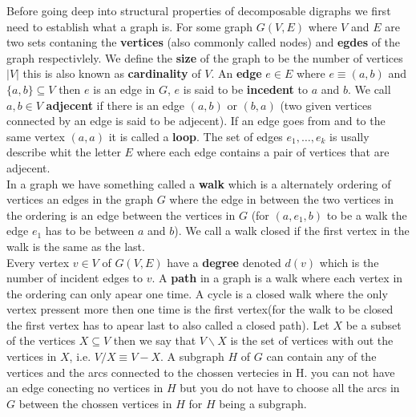 Before going deep into structural properties of decomposable digraphs we first need to establish what a graph is.
For some graph $G(V,E)$ where $V$ and $E$ are two sets contaning the \textbf{vertices} (also commonly called nodes) and \textbf{egdes} of the graph respectivlely.
We define the \textbf{size} of the graph to be the number of vertices $|V|$ this is also known as \textbf{cardinality} of $V$.
An \textbf{edge} $e \in E$ where $e \equiv (a, b)$ and $\{ a, b \} \subseteq V$ then $e$ is an edge in $G$, $e$ is said to be \textbf{incedent} to $a$ and $b$. 
We call $a,b \in V$ \textbf{adjecent} if there is an edge $(a,b)$ or $(b,a)$ (two given vertices connected by an edge is said to be adjecent).
If an edge goes from and to the same vertex $(a,a)$ it is called a \textbf{loop}.
The set of edges $e_1, \dots, e_k$ is usally describe whit the letter $E$ where each edge contains a pair of vertices that are adjecent. \\
In a graph we have something called a \textbf{walk} which is a alternately ordering of vertices an edges in the graph $G$ where the edge in between the two vertices in the ordering is an edge between the vertices in $G$ (for $(a,e_1,b)$ to be a walk the edge $e_1$ has to be between $a$ and $b$).
We call a walk closed if the first vertex in the walk is the same as the last.\\
Every vertex $v\in V$ of $G(V,E)$ have a \textbf{degree} denoted $d(v)$ which is the number of incident edges to $v$.
A \textbf{path} in a graph is a walk where each vertex in the ordering can only apear one time. A cycle is a closed walk where the only vertex pressent more then one time is the first vertex(for the walk to be closed the first vertex has to apear last to also called a closed path).
Let $X$ be a subset of the vertices $X\subseteq V$ then we say that $V\backslash X$ is the set of vertices with out the vertices in $X$, i.e. $V/X \equiv V-X$. 
A subgraph $H$ of $G$ can contain any of the vertices and the arcs connected to the chossen vertecies in H. you can not have an edge conecting no vertices in $H$ but you do not have to choose all the arcs in $G$ between the chossen vertices in $H$ for $H$ being a subgraph. 
